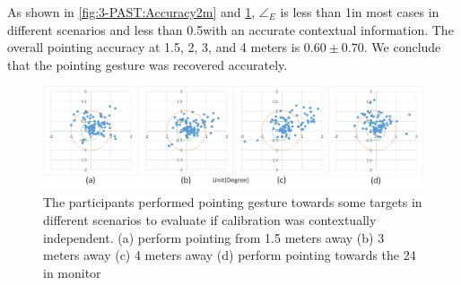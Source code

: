 As shown in \figurename{ \ref{fig:3-PAST:Accuracy2m}} and \figurename{ \ref{fig:3-PAST:Accuracy}}, ${\angle}_{E}$ is less than 1\degree in most cases in different scenarios and less than 0.5\degree with an accurate contextual information. The overall pointing accuracy at 1.5, 2, 3, and 4 meters is $0.60\pm0.70$\degree. We conclude that the pointing gesture was recovered accurately.
\begin{figure} [htb]
	\centering
	\includegraphics[width=\linewidth]{figures/3-PAST/accuracy.png}
	\caption{The participants performed pointing gesture towards some targets in different scenarios to evaluate if calibration was contextually independent. (a) perform pointing from 1.5 meters away (b) 3 meters away (c) 4 meters away (d) perform pointing towards the 24 in monitor }
	\label{fig:3-PAST:Accuracy}
\end{figure}

